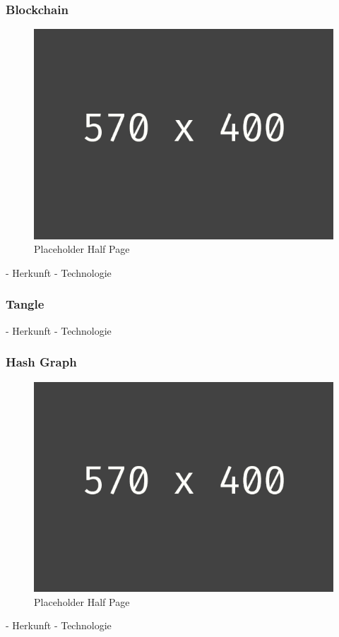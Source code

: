\subsubsection{Blockchain}
\begin{figure}[h!]
	\centering
	\includegraphics[width=1.0\linewidth]{pictures/placeholder_half_page}
	\caption[Placeholder Half Page]{Placeholder Half Page}
	\label{fig:placeholder_half_page}
\end{figure}
- Herkunft
- Technologie

\subsubsection{Tangle}
- Herkunft
- Technologie

\subsubsection{Hash Graph}
\begin{figure}[h!]
	\centering
	\includegraphics[width=1.0\linewidth]{pictures/placeholder_half_page}
	\caption[Placeholder Half Page]{Placeholder Half Page}
	\label{fig:placeholder_half_page}
\end{figure}
- Herkunft
- Technologie

